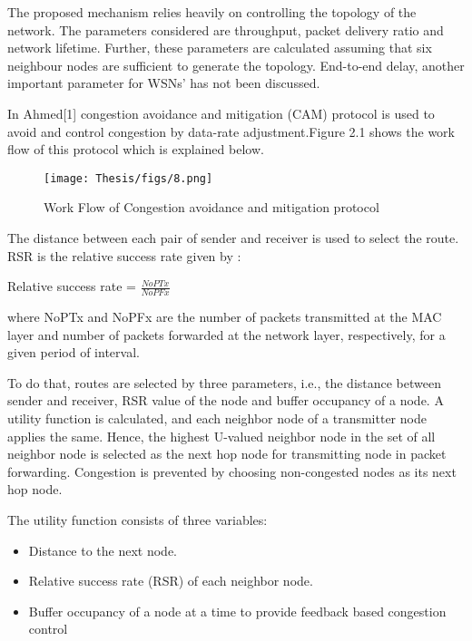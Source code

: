\par 
The proposed mechanism relies heavily on controlling the topology of the network. The parameters considered are throughput, packet delivery ratio and network lifetime. Further, these parameters are calculated assuming that six neighbour nodes are sufficient to generate the topology. End-to-end delay, another important parameter for WSNs' has not been discussed. 
\par
In Ahmed[1] congestion avoidance and mitigation (CAM) protocol is used to avoid and control congestion by data-rate adjustment.Figure 2.1 shows the work flow of this protocol which is explained below.
\begin{figure}[H]
    \centering
    \texttt{[image: Thesis/figs/8.png]}
    \caption{Work Flow of Congestion avoidance and mitigation protocol}
    \label{fig:my_label}
\end{figure}
The distance between each pair of sender and receiver is used to select the route. RSR is the relative success rate given by :
{\begin{center}
     Relative success rate = $\frac{NoPTx}{NoPFx}$
\end{center}}
where NoPTx and NoPFx are the number of packets transmitted at the MAC layer and number of packets forwarded at the network layer, respectively, for a given period of interval.
\par
To do that, routes are selected by three parameters, i.e., the distance between sender and receiver, RSR value of the node and buffer occupancy of a node. A utility function is calculated, and each neighbor node of a transmitter node applies the same. Hence, the highest U-valued neighbor node in the set of all neighbor node is selected as the next hop node for transmitting node in packet forwarding. Congestion is prevented by choosing non-congested nodes as its next hop node. 
\par
The utility function consists of three variables: 
\begin{itemize}
\item Distance to the next node. 
\item Relative success rate (RSR) of each neighbor node. 
\item Buffer occupancy of a node at a time to provide feedback based congestion control
\end{itemize}
